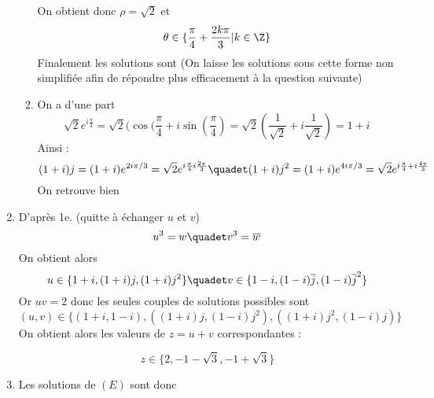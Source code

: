 \documentclass[a4paper, 11pt,reqno]{article}
\begin{document}
\begin{correction}
\begin{enumerate}
\begin{enumerate}
On obtient donc $\rho =\sqrt{2}$ et 
$$\theta \in \{ \frac{\pi }{4} +\frac{2k\pi}{3} |k\in \Z\}$$
Finalement les solutions sont 
(On laisse les solutions sous cette forme non simplifiée afin de répondre plus efficacement à la question suivante) 
\item  On  a d'une part 
$$\sqrt{2} e^{i\frac{\pi}{4}} = \sqrt{2} (\cos(\frac{\pi}{4} +i \sin(\frac{\pi}{4}) = \sqrt{2} (\frac{1}{\sqrt{2}}+i \frac{1}{\sqrt{2}}) = 1+i$$
Ainsi : 
$$(1+i)j= (1+i) e^{2i\pi/3} =\sqrt{2} e^{i\frac{\pi}{4} 
i\frac{2\pi}{3}} \quadet (1+i)j^2= (1+i) e^{4i\pi/3}=\sqrt{2} e^{i\frac{\pi}{4}+i\frac{4\pi}{3}}$$
On retrouve bien 
\end{enumerate}
\item D'après 1e. (quitte à échanger $u$ et $v$) 
$$u^3 =w \quadet v^3 =\overline{w}$$
On obtient alors 
$$u \in  \{1+i,(1+i) j,(1+i) j^2\} \quadet v\in \{1-i,(1-i)\overline{ j},(1-i) \overline{j}^2\}$$
Or $uv=2$ donc les seules couples de solutions possibles sont 
$$(u,v) \in \{(1+i, 1-i), ((1+i)j, (1-i)j^2), ((1+i)j^2, (1-i)j)\}$$
On obtient alors les valeurs de  $z=u+v$ correspondantes : 

$$z\in \{ 2, -1-\sqrt{3}, -1+\sqrt{3}\}$$
\item 
Les solutions de $(E)$ sont donc

\end{enumerate}
\end{correction}
\end{document}
